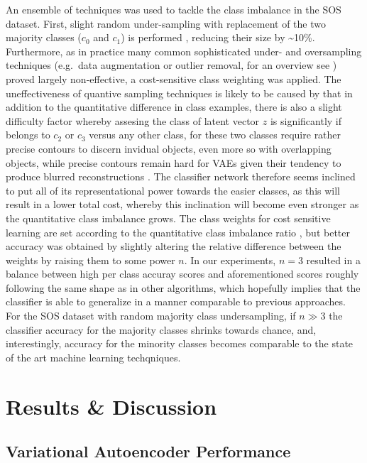 \documentclass[twocolumn]{article}
\begin{document}
{An ensemble of techniques was used to tackle the class imbalance in the
SOS dataset. First, slight random under-sampling with replacement of the
two majority classes (\(c_0\) and \(c_1\)) is performed
\citep[see][]{JMLR:v18:16-365}, reducing their size by
\textasciitilde{}10\%. Furthermore, as in practice many common
sophisticated under- and oversampling techniques (e.g.~data augmentation
or outlier removal, for an overview see \citet{fernandez2013}) proved
largely non-effective, a cost-sensitive class weighting was applied. The
uneffectiveness of quantive sampling techniques is likely to be caused
by that in addition to the quantitative difference in class examples,
there is also a slight difficulty factor whereby assesing the class of
latent vector \(z\) is significantly if belongs to \(c_2\) or \(c_3\)
versus any other class, for these two classes require rather precise
contours to discern invidual objects, even more so with overlapping
objects, while precise contours remain hard for VAEs given their
tendency to produce blurred reconstructions
\citep{larsen2015autoencoding}. The classifier network therefore seems
inclined to put all of its representational power towards the easier
classes, as this will result in a lower total cost, whereby this
inclination will become even stronger as the quantitative class
imbalance grows. The class weights for cost sensitive learning are set
according to the quantitative class imbalance ratio \citep[similair to
section 3.2 in][]{fernandez2013}, but better accuracy was obtained by
slightly altering the relative difference between the weights by raising
them to some power \(n\). In our experiments, \(n=3\) resulted in a
balance between high per class accuray scores and aforementioned scores
roughly following the same shape as in other algorithms, which hopefully
implies that the classifier is able to generalize in a manner comparable
to previous approaches. For the SOS dataset with random majority class
undersampling, if \(n \gg 3\) the classifier accuracy for the majority
classes shrinks towards chance, and, interestingly, accuracy for the
minority classes becomes comparable to the state of the art machine
learning techqniques.

\hypertarget{results-discussion}{%
\section{Results \& Discussion}\label{results-discussion}}

\hypertarget{variational-autoencoder-performance}{%
\subsection{Variational Autoencoder
Performance}\label{variational-autoencoder-performance}}

}
\end{document}
